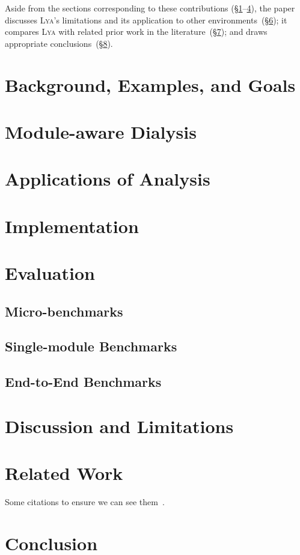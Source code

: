 \documentclass[letterpaper,twocolumn,10pt]{article}
\newcommand{\sx}[1]{(\S\ref{#1})}
\newcommand{\sys}{{\scshape Lya}\xspace}
\begin{document}
Aside from the sections corresponding to these contributions (\S\ref{bg}--\ref{impl}), the paper discusses \sys's limitations and its application to other environments~\sx{diss};
   it compares \sys with related prior work in the literature~\sx{rw}; and draws appropriate conclusions~\sx{end}.


\section{Background, Examples, and Goals}
\label{bg}

\section{Module-aware Dialysis}
\label{design}

\section{Applications of Analysis}
\label{apps}

\section{Implementation}
\label{impl}

\section{Evaluation}
\label{eval}

\subsection{Micro-benchmarks}
\label{micro}

\subsection{Single-module Benchmarks}
\label{meso}

\subsection{End-to-End Benchmarks}
\label{macro}

\section{Discussion and Limitations}
\label{diss}

\section{Related Work}
\label{rw}
Some citations to ensure we can see them~\cite{Christophe:2015:DAU:2819009.2819180, Keil:2013:EDA:2508168.2508176, Lehmann:2019:WFD:3297858.3304068, Sun:2018:EDA:3178372.3179527}.

\section{Conclusion}
\label{end}

% 



\end{document}

